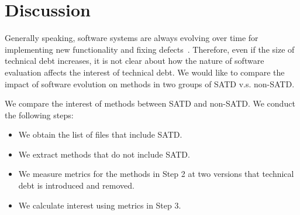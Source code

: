 

\section{Discussion}


Generally speaking, software systems are always evolving over time for implementing new functionality and fixing defects~\cite{xxx}.
Therefore, even if the size of technical debt increases, it is not clear about how the nature of software evaluation affects the interest of technical debt.
We would like to compare the impact of software evolution on methods in two groups of SATD v.s. non-SATD.

We compare the interest of methods between SATD and non-SATD.
We conduct the following steps:
\begin{itemize}
\item We obtain the list of files that include SATD. %
\item We extract methods that do not include SATD. %
\item We measure metrics for the methods in Step 2 at two versions that technical debt is introduced and removed.
\item We calculate interest using metrics in Step 3.
\end{itemize}

